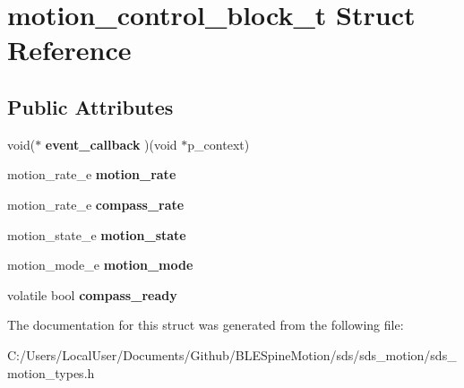 \hypertarget{structmotion__control__block__t}{}\section{motion\+\_\+control\+\_\+block\+\_\+t Struct Reference}
\label{structmotion__control__block__t}
\subsection*{Public Attributes}
\begin{DoxyCompactItemize}
\item 
\mbox{\label{structmotion__control__block__t_ae8cd233a6438c7403bec9554ff406c1a}} 
void($\ast$ {\bfseries event\+\_\+callback} )(void $\ast$p\+\_\+context)
\item 
\mbox{\label{structmotion__control__block__t_af29cceb056dcd52bccf1202e30acf565}} 
motion\+\_\+rate\+\_\+e {\bfseries motion\+\_\+rate}
\item 
\mbox{\label{structmotion__control__block__t_a22754cd9bea2b446b70bd020c568504d}} 
motion\+\_\+rate\+\_\+e {\bfseries compass\+\_\+rate}
\item 
\mbox{\label{structmotion__control__block__t_a6bbaaa3317c079b6bcc194890ef19031}} 
motion\+\_\+state\+\_\+e {\bfseries motion\+\_\+state}
\item 
\mbox{\label{structmotion__control__block__t_a5faccb4132c18f71baf7eea8ce26b270}} 
motion\+\_\+mode\+\_\+e {\bfseries motion\+\_\+mode}
\item 
\mbox{\label{structmotion__control__block__t_a0dc720f4d6372f3fabbec80afb32f792}} 
volatile bool {\bfseries compass\+\_\+ready}
\end{DoxyCompactItemize}


The documentation for this struct was generated from the following file\+:\begin{DoxyCompactItemize}
\item 
C\+:/\+Users/\+Local\+User/\+Documents/\+Github/\+B\+L\+E\+Spine\+Motion/sds/sds\+\_\+motion/sds\+\_\+motion\+\_\+types.\+h\end{DoxyCompactItemize}
